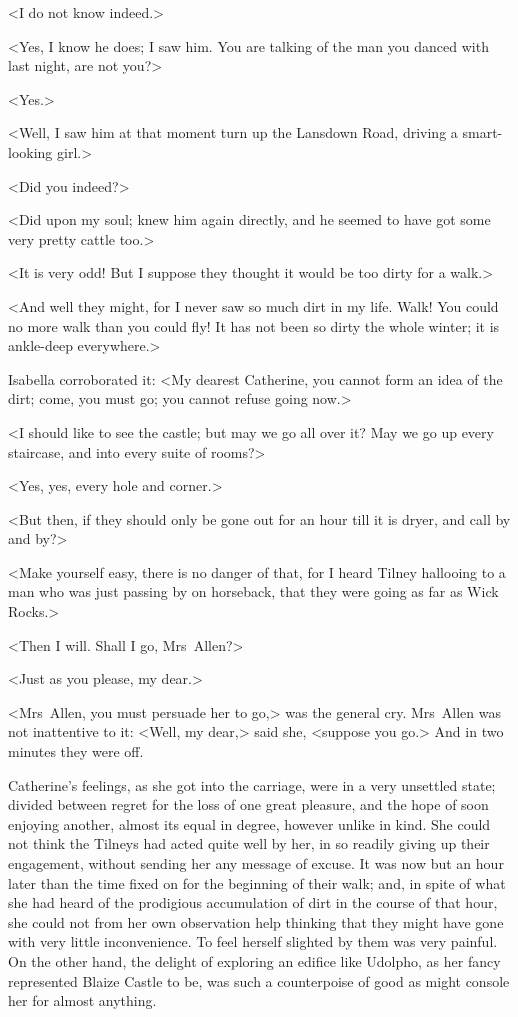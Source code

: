  <I do not know indeed.> 

 <Yes, I know he does; I saw him. You are talking of the man you danced with last night, are not you?> 

 <Yes.> 

 <Well, I saw him at that moment turn up the Lansdown Road, driving a smart-looking girl.> 

 <Did you indeed?> 

 <Did upon my soul; knew him again directly, and he seemed to have got some very pretty cattle too.> 

 <It is very odd! But I suppose they thought it would be too dirty for a walk.> 

 <And well they might, for I never saw so much dirt in my life. Walk! You could no more walk than you could fly! It has not been so dirty the whole winter; it is ankle-deep everywhere.> 

 Isabella corroborated it: <My dearest Catherine, you cannot form an idea of the dirt; come, you must go; you cannot refuse going now.> 

 <I should like to see the castle; but may we go all over it? May we go up every staircase, and into every suite of rooms?> 

 <Yes, yes, every hole and corner.> 

 <But then, if they should only be gone out for an hour till it is dryer, and call by and by?> 

 <Make yourself easy, there is no danger of that, for I heard Tilney hallooing to a man who was just passing by on horseback, that they were going as far as Wick Rocks.> 

 <Then I will. Shall I go, Mrs~Allen?> 

 <Just as you please, my dear.> 

 <Mrs~Allen, you must persuade her to go,> was the general cry. Mrs~Allen was not inattentive to it: <Well, my dear,> said she, <suppose you go.> And in two minutes they were off. 

 Catherine's feelings, as she got into the carriage, were in a very unsettled state; divided between regret for the loss of one great pleasure, and the hope of soon enjoying another, almost its equal in degree, however unlike in kind. She could not think the Tilneys had acted quite well by her, in so readily giving up their engagement, without sending her any message of excuse. It was now but an hour later than the time fixed on for the beginning of their walk; and, in spite of what she had heard of the prodigious accumulation of dirt in the course of that hour, she could not from her own observation help thinking that they might have gone with very little inconvenience. To feel herself slighted by them was very painful. On the other hand, the delight of exploring an edifice like Udolpho, as her fancy represented Blaize Castle to be, was such a counterpoise of good as might console her for almost anything. 

